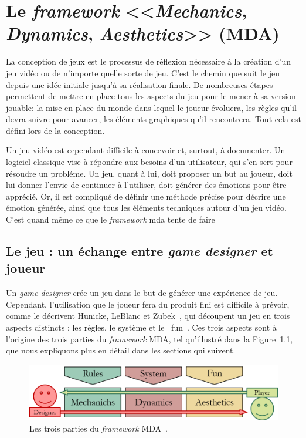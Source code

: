 \chapter{Le \emph{framework} <<\emph{Mechanics}, \emph{Dynamics}, \emph{Aesthetics}>> (MDA)}
\label{chap.MDA}


La conception de jeux est le processus de réflexion nécessaire à la création d'un jeu vidéo ou de n'importe quelle sorte de jeu.
C'est le chemin que suit le jeu depuis une idée initiale jusqu'à sa réalisation finale.
De nombreuses étapes permettent de mettre en place tous les aspects du jeu pour le mener à sa version jouable: 
la mise en place du monde dans lequel le joueur évoluera, les règles qu'il devra suivre pour avancer, les éléments graphiques qu'il rencontrera. Tout cela est défini lors de la conception. 

Un jeu vidéo est cependant difficile à concevoir et, surtout, à documenter.
Un logiciel classique vise \`a répondre aux besoins d'un utilisateur, qui s'en sert pour résoudre un probléme.
Un jeu, quant à lui, doit proposer un but au joueur, doit lui donner l'envie de continuer à l'utiliser, doit générer des émotions pour être apprécié.
Or, il est compliqué de définir une méthode précise pour décrire une émotion générée, ainsi que tous les éléments techniques autour d'un jeu vidéo. 
C'est quand m\^eme ce que le \emph{framework} \gls{mda} tente de faire


\section{Le jeu : un échange entre \emph{game designer} et joueur}




Un \emph{game designer} cr\'ee un jeu dans le but de générer une expérience de jeu. 
Cependant, l'utilisation que le joueur fera du produit fini est difficile \`a pr\'evoir, comme
le d\'ecrivent Hunicke, LeBlanc et Zubek~\cite{MDA_formal}, qui découpent un jeu en trois aspects distincts : les règles, le système et le \guillemotleft~fun~\guillemotright. 
Ces trois aspects sont à l'origine des trois parties du \emph{framework} MDA, tel qu'illustré dans la Figure~\ref{fig:mda}, que nous expliquons plus en d\'etail dans les sections qui suivent.
\begin{figure}[H]
    \begin{center}
    \includegraphics[width=14cm]{10_img/chap3/mda.png} 
    \caption{Les trois parties du \emph{framework} MDA~\cite{MDA_formal}.}
    \label{fig:mda}
    \end{center}
\end{figure}


